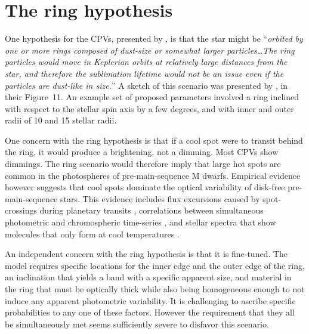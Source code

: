 \documentclass[11pt,twocolumn,tighten,linenumbers]{aastex63}
\begin{document}

\appendix

\section{The ring hypothesis}
\label{app:ring}

One hypothesis for the CPVs, presented by \citet{2019ApJ...876..127Z},
is that the star might be ``{\it orbited by one or more rings composed
of dust-size or somewhat larger particles\ldots The ring particles
would move in Keplerian orbits at relatively large distances from the
star, and therefore the sublimation lifetime would not be an issue
even if the particles are dust-like in size.}'' A sketch of this
scenario was presented by \citet{2019ApJ...876..127Z}, in their
Figure~11.  An example set of proposed parameters involved a ring
inclined with respect to the stellar spin axis by a few degrees, and
with inner and outer radii of 10 and 15 stellar radii.

One concern with the ring hypothesis is that if a cool spot were to
transit behind the ring, it would produce a brightening, not a
dimming.   Most CPVs show dimmings.   The ring scenario would therefore
imply that large hot spots are common in the photospheres of
pre-main-sequence M dwarfs.  Empirical evidence however suggests that
cool spots dominate the optical variability of disk-free
pre-main-sequence stars.  This evidence includes flux excursions
caused by spot-crossings during planetary transits
\citep[e.g.][]{2020AJ....160...33R,2022AJ....163..147G}, correlations
between simultaneous photometric and chromospheric time-series
\citep{2019A&A...621A..21R}, and stellar spectra that show molecules
that only form at cool temperatures
\citep[e.g.][]{2017ApJ...836..200G,2023ApJ...946...10P}.

An independent  concern with the ring hypothesis is that it is
fine-tuned.  The model requires specific locations for the inner edge
and the outer edge of the ring, an inclination that yields a band with
a specific apparent size, and material in the ring that must be
optically thick while also being homogeneous enough to not induce any
apparent photometric variability.  It is challenging to ascribe
specific probabilities to any one of these factors.  However the
requirement that they all be simultaneously met seems sufficiently
severe to disfavor this scenario.
\end{document}
